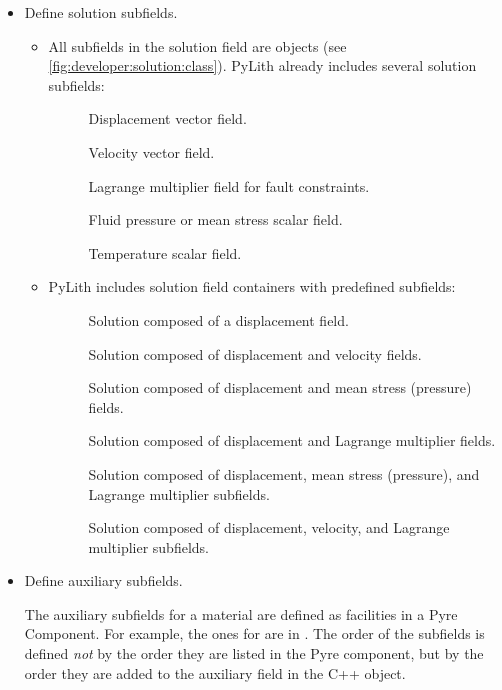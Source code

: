\begin{itemize}
\item Define solution subfields.

  \begin{itemize}
  \item All subfields in the solution field are
     objects (see
    \vref{fig:developer:solution:class}). PyLith already includes
    several solution subfields:
    \begin{description}
    \item[] Displacement vector field.
    \item[] Velocity vector field.
    \item[] Lagrange multiplier field for
      fault constraints.
    \item[] Fluid pressure or mean stress scalar field.
    \item[] Temperature scalar field.
    \end{description}
  \item PyLith includes solution field containers with predefined
    subfields:
    \begin{description}
    \item[] Solution composed of a displacement field.
    \item[] Solution composed of displacement and velocity fields.
    \item[] Solution composed of displacement and
      mean stress (pressure) fields.
    \item[] Solution composed of displacement
      and Lagrange multiplier fields.
    \item[] Solution composed of
      displacement, mean stress (pressure), and Lagrange multiplier subfields.
    \item[] Solution composed of
      displacement, velocity, and Lagrange multiplier subfields.
    \end{description}
  \end{itemize}
%
\item Define auxiliary subfields.

  The auxiliary subfields for a material are defined as facilities in
  a Pyre Component. For example, the ones for
   are in
  . The order of the subfields
  is defined {\em not} by the order they are listed in the Pyre
  component, but by the order they are added to the auxiliary field in
  the C++ object.


\end{itemize}
